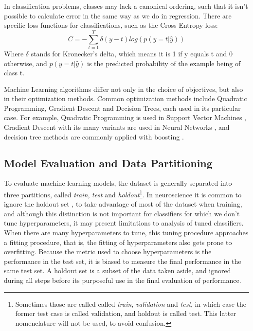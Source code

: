 In classification problems, classes may lack a canonical ordering, such that it isn't possible to calculate error in the same way as we do in regression. There are specific loss functions for classifications, such as the Cross-Entropy loss:
\begin{equation}
    C = -\sum_{t=1}^{T}\delta(y-t)log(p(y=t|\hat{y}))
\end{equation}
Where $\delta$ stands for Kronecker's delta, which means it is 1 if y equals t and 0 otherwise, and $p(y=t|\hat{y})$ is the predicted probability of the example being of class t.

Machine Learning algorithms differ not only in the choice of objectives, but also in their optimization methods. Common optimization methods include Quadratic Programming, Gradient Descent and Decision Trees, each used in its particular case. For example, Quadratic Programming is used in Support Vector Machines \cite{chang2011libsvm}, Gradient Descent with its many variants are used in Neural Networks \cite{ruder2016overview}, and decision tree methods are commonly applied with boosting \cite{chen2016xgboost}.

\subsection{Model Evaluation and Data Partitioning}

To evaluate machine learning models, the dataset is generally separated into three partitions, called \textit{train}, \textit{test} and \textit{holdout}\footnote{Sometimes those are called called \textit{train}, \textit{validation} and \textit{test}, in which case the former test case is called validation, and holdout is called test. This latter nomenclature will not be used, to avoid confusion.}\cite{kohavi1995study}. In neuroscience it is common to ignore the holdout set \cite{bakhurin2017differential}, to take advantage of most of the dataset when training, and although this distinction is not important for classifiers for which we don't tune hyperparameters, it may present limitations to analysis of tuned classifiers. When there are many hyperparameters to tune, this tuning procedure approaches a fitting procedure, that is, the fitting of hyperparameters also gets prone to overfitting. Because the metric used to choose hyperparameters is the performance in the test set, it is biased to measure the final performance in the same test set. A holdout set is a subset of the data taken aside, and ignored during all steps before its purposeful use in the final evaluation of performance.

